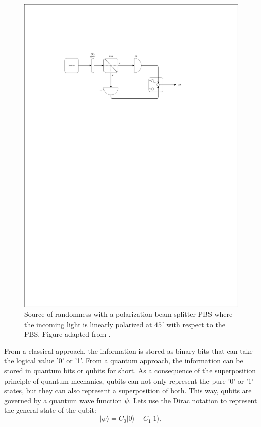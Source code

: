 \begin{figure}[H]
    \centering
        \includegraphics[clip, trim=3cm 20cm 5cm 5cm, width=1.00\textwidth]{./sdf/qrng/figures_raw/Random_Number_Generator.pdf}
    \caption{Source of randomness with a polarization beam splitter PBS where the incoming light is linearly polarized at $45^{\circ}$ with respect to the PBS. Figure adapted from \cite{Zeilinger}.}\label{qrng}
\end{figure}

From a classical approach, the information is stored as binary bits that can take the logical value '0' or '1'. From a quantum approach, the information can be stored in quantum bits or qubits for short. As a consequence of the superposition principle of quantum mechanics, qubits can not only represent the pure '0' or '1' states, but they can also represent a superposition of both. This way, qubits are governed by a quantum wave function $\psi$. Lets use the Dirac notation to represent the general state of the qubit:
\begin{equation}\label{eq:qubit}
  |\psi\rangle = C_0 |0\rangle + C_1 |1\rangle,
\end{equation}

